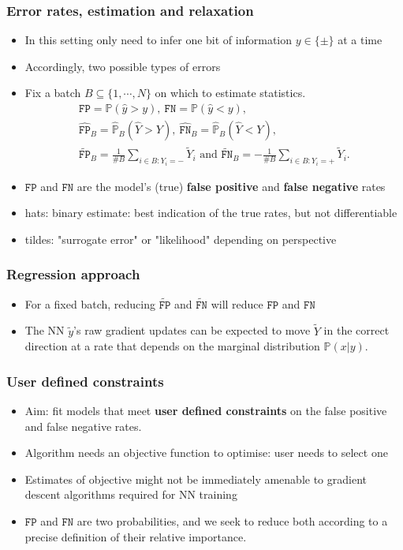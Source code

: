 \documentclass{beamer}
\newcommand{\TWO}{\{\pm\}}
\newcommand{\PREDSMOOTH}{{\tilde y}}%
\newcommand{\yP}{{\hat y}}
\newcommand{\YP}{{\hat Y}}
\newcommand{\YN}{{\tilde Y}}
\newcommand{\Prob}{{\mathbb P}}
\newcommand{\ProbH}{{\widehat{\mathbb P}}}
\newcommand{\FP}{{\texttt{FP}}}
\newcommand{\FN}{{\texttt{FN}}}
\newcommand{\FPE}{{\widehat{\texttt{FP}}}}
\newcommand{\FNE}{{\widehat{\texttt{FN}}}}
\newcommand{\Fp}{\widetilde{\texttt{FP}}}
\newcommand{\Fn}{\widetilde{\texttt{FN}}}
\begin{document}
\begin{frame}
\frametitle{Error rates, estimation and relaxation}
  \begin{itemize}
\item
In this setting only need to infer one bit of information $y\in\TWO$ at a time
\item
Accordingly, two possible types of errors
\item
Fix a batch $B\subseteq\{1,\cdots,N\}$ on which to estimate statistics.
\begin{gather*}
  \FP=\Prob(\yP>y),~\FN=\Prob(\yP<y),\\
  \FPE_B=\ProbH_B(\YP>Y),~\FNE_B=\ProbH_B(\YP<Y),\\
  \Fp_B=\tfrac1{\#B}\sum_{i\in B:Y_i=-}\YN_i\text{ and }\Fn_B=-\tfrac1{\#B}\sum_{i\in B:Y_i=+}\YN_i.
\end{gather*}
\item
  $\FP$ and $\FN$ are the model's (true) \textbf{false positive} and \textbf{false negative} rates
\item hats: binary estimate: best indication of the true rates, but not differentiable
\item tildes: "surrogate error" or "likelihood" depending on perspective
\end{itemize}
\end{frame}
\begin{frame}
\frametitle{Regression approach}
\begin{itemize}
\item
  For a fixed batch, reducing $\Fp$ and $\Fn$ will reduce $\FP$ and $\FN$
\item
  The NN $\PREDSMOOTH$'s raw gradient updates can be expected to move $\YN$ in the correct direction at a rate that depends on the marginal distribution $\mathbb P(x|y)$.
\end{itemize}
\end{frame}
\begin{frame}
\frametitle{User defined constraints}
\begin{itemize}
\item
  Aim: fit models that meet \textbf{user defined constraints} on the false positive and false negative rates.
\item
  Algorithm needs an objective function to optimise: user needs to select one
\item
  Estimates of objective might not be immediately amenable to gradient descent algorithms required for NN training
\item
  $\FP$ and $\FN$ are two probabilities, and we seek to reduce both according to a precise definition of their relative importance.
\end{itemize}
\end{frame}
\end{document}
